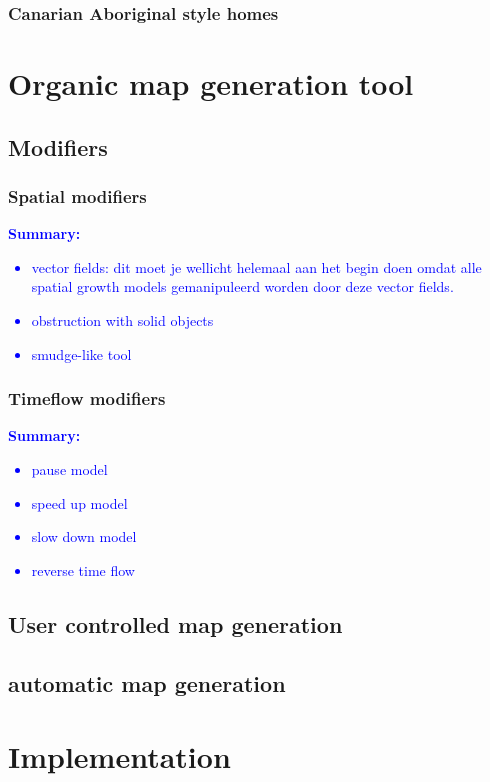 \documentclass{article}
\newcommand{\inhoud}[1]{\textcolor{blue}{\textbf{Summary: }\it{#1}}}
\begin{document}
\subsubsection{Canarian Aboriginal style homes}

\section{Organic map generation tool}

\subsection{Modifiers}

\subsubsection{Spatial modifiers}

\inhoud{
\begin{itemize}
\item vector fields: dit moet je wellicht helemaal aan het begin doen omdat alle spatial growth models
gemanipuleerd worden door deze vector fields.
\item obstruction with solid objects
\item smudge-like tool
\end{itemize}
}

\subsubsection{Timeflow modifiers}
\inhoud{
\begin{itemize}
\item pause model
\item speed up model
\item slow down model
\item reverse time flow
\end{itemize}
}


\subsection{User controlled map generation}

\subsection{automatic map generation} 


\section{Implementation}
\end{document}
